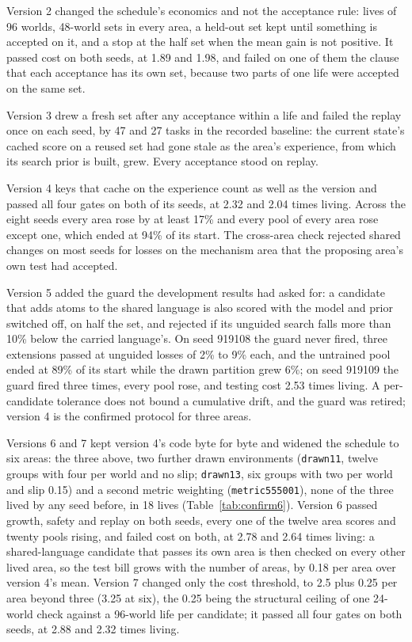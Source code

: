 \documentclass[11pt]{article}
\begin{document}
Version 2 changed the schedule's economics and not the acceptance rule: lives of 96 worlds, 48-world sets in every area, a held-out set kept until something is accepted on it, and a stop at the half set when the mean gain is not positive. It passed cost on both seeds, at 1.89 and 1.98, and failed on one of them the clause that each acceptance has its own set, because two parts of one life were accepted on the same set.

Version 3 drew a fresh set after any acceptance within a life and failed the replay once on each seed, by 47 and 27 tasks in the recorded baseline: the current state's cached score on a reused set had gone stale as the area's experience, from which its search prior is built, grew. Every acceptance stood on replay.

Version 4 keys that cache on the experience count as well as the version and passed all four gates on both of its seeds, at 2.32 and 2.04 times living. Across the eight seeds every area rose by at least 17\% and every pool of every area rose except one, which ended at 94\% of its start. The cross-area check rejected shared changes on most seeds for losses on the mechanism area that the proposing area's own test had accepted.

Version 5 added the guard the development results had asked for: a candidate that adds atoms to the shared language is also scored with the model and prior switched off, on half the set, and rejected if its unguided search falls more than 10\% below the carried language's. On seed 919108 the guard never fired, three extensions passed at unguided losses of 2\% to 9\% each, and the untrained pool ended at 89\% of its start while the drawn partition grew 6\%; on seed 919109 the guard fired three times, every pool rose, and testing cost 2.53 times living. A per-candidate tolerance does not bound a cumulative drift, and the guard was retired; version 4 is the confirmed protocol for three areas.

Versions 6 and 7 kept version 4's code byte for byte and widened the schedule to six areas: the three above, two further drawn environments (\texttt{drawn11}, twelve groups with four per world and no slip; \texttt{drawn13}, six groups with two per world and slip 0.15) and a second metric weighting (\texttt{metric555001}), none of the three lived by any seed before, in 18 lives (Table~\ref{tab:confirm6}). Version 6 passed growth, safety and replay on both seeds, every one of the twelve area scores and twenty pools rising, and failed cost on both, at 2.78 and 2.64 times living: a shared-language candidate that passes its own area is then checked on every other lived area, so the test bill grows with the number of areas, by 0.18 per area over version 4's mean. Version 7 changed only the cost threshold, to 2.5 plus 0.25 per area beyond three (3.25 at six), the 0.25 being the structural ceiling of one 24-world check against a 96-world life per candidate; it passed all four gates on both seeds, at 2.88 and 2.32 times living.
\end{document}

